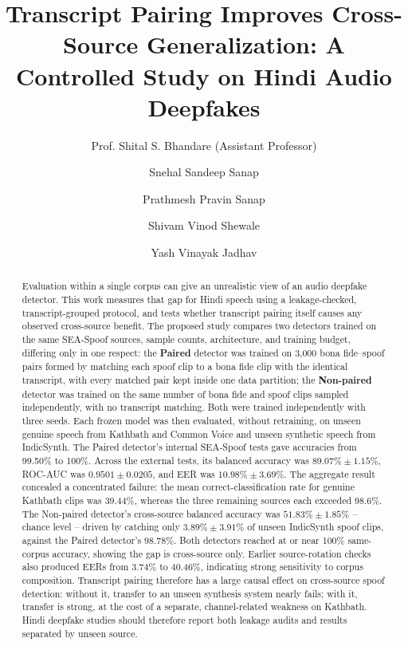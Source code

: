 \documentclass[3p,times,procedia]{elsarticle}
\begin{document}
\begin{frontmatter}


\title{Transcript Pairing Improves Cross-Source Generalization: A Controlled Study on Hindi Audio Deepfakes}

\author[kkw]{Prof. Shital S. Bhandare (Assistant Professor)}
\author[kkw]{Snehal Sandeep Sanap}
\author[kkw]{Prathmesh Pravin Sanap}
\author[kkw]{Shivam Vinod Shewale}
\author[kkw]{Yash Vinayak Jadhav}

\address[kkw]{Department of Computer Engineering, K. K. Wagh Institute of Engineering Education and Research, Nashik 422003, Maharashtra, India}

\begin{abstract}
Evaluation within a single corpus can give an unrealistic view of an audio
deepfake detector. This work measures that gap for Hindi speech using a
leakage-checked, transcript-grouped protocol, and tests whether transcript
pairing itself causes any observed cross-source benefit. The proposed study compares two
detectors trained on the same SEA-Spoof sources, sample counts,
architecture, and training budget, differing only in one respect: the
\textbf{Paired} detector was trained on 3,000 bona fide--spoof pairs formed
by matching each spoof clip to a bona fide clip with the identical
transcript, with every matched pair kept inside one data partition; the
\textbf{Non-paired} detector was trained on the same number of bona fide and
spoof clips sampled independently, with no transcript matching. Both were
trained independently with three seeds. Each frozen model was then
evaluated, without retraining, on unseen genuine speech from Kathbath and
Common Voice and unseen synthetic speech from IndicSynth. The Paired
detector's internal SEA-Spoof tests gave accuracies from 99.50\% to 100\%.
Across the external tests, its balanced accuracy was $89.07\%\pm1.15\%$,
ROC-AUC was $0.9501\pm0.0205$, and EER was $10.98\%\pm3.69\%$. The aggregate
result concealed a concentrated failure: the mean correct-classification
rate for genuine Kathbath clips was 39.44\%, whereas the three remaining
sources each exceeded 98.6\%. The Non-paired detector's cross-source
balanced accuracy was $51.83\%\pm1.85\%$ -- chance level -- driven by
catching only $3.89\%\pm3.91\%$ of unseen IndicSynth spoof clips, against
the Paired detector's 98.78\%. Both detectors reached at or near 100\%
same-corpus accuracy, showing the gap is cross-source only. Earlier source-rotation
checks also produced EERs from 3.74\% to 40.46\%, indicating strong
sensitivity to corpus composition. Transcript pairing therefore has a large
causal effect on cross-source spoof detection: without it, transfer to an
unseen synthesis system nearly fails; with it, transfer is strong, at the
cost of a separate, channel-related weakness on Kathbath. Hindi deepfake
studies should therefore report both leakage audits and results separated
by unseen source.
\end{abstract}


\end{frontmatter}
\end{document}
